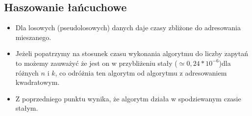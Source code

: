 \documentclass{article}
\begin{document}
\subsection{Haszowanie łańcuchowe}
\begin{itemize}
	\item Dla losowych (pseudolosowych) danych daje czasy zbliżone do adresowania mieszanego. 
	\item Jeżeli popatrzymy na stosunek czasu wykonania algorytmu do liczby zapytań to możemy zauważyć że jest on w przybliżeniu stały ($\simeq 0,24 * 10^{-6}$)dla różnych $n$ i $k$, co odróżnia ten algorytm od algorytmu z adresowaniem kwadratowym. 
	\item Z poprzedniego punktu wynika, że algorytm działa w spodziewanym czasie stałym. 
\end{itemize}
\end{document}
